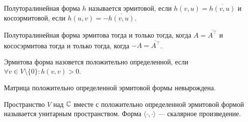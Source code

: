 \begin{defn}[Эрмитовость]
    Полуторалинейная форма $ h$ называется   {\sf эрмитовой}, если  $ h(v, u) = \overline{h(v, u)}$ и {\sf косоэрмитовой}, если $ h(u, v) = - \overline{h(v, u)}$.   
\end{defn}
\begin{lm}
    Полуторалинейная  форма эрмитова  тогда и только тогда, когда $ A = \overline{A^{\top}}$ и кососэрмитова тогда и только тогда, когда $-A = \overline{A^{\top}}$.
\end{lm}
\begin{defn}
    Эрмитова форма назовется {\sf положительно определенной}, если $ \forall v \in V \setminus \{0\}\colon h(v, v) > 0$. 
\end{defn}
\begin{lm}
    Матрица положительно определенной эрмитовой формы невырождена.
\end{lm}
\begin{defn}
    Пространство $ V$ над $ \mathbb{C}$ вместе с положительно определенной эрмитовой формой называется {\sf унитарным}  пространством. Форма $ \langle \cdot , \cdot  \rangle$ --- скалярное произведение. 
\end{defn}

